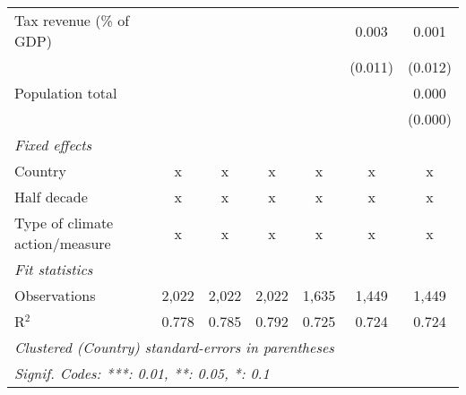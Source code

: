 \begin{tabular}{lcccccc}
   Tax revenue (\% of GDP)                                                                             &         &               &                &                & 0.003         & 0.001\\   
                                                                                                       &         &               &                &                & (0.011)       & (0.012)\\   
   Population total                                                                                    &         &               &                &                &               & 0.000\\   
                                                                                                       &         &               &                &                &               & (0.000)\\   
   \emph{Fixed effects}\\
   Country                                                                                             & x       & x             & x              & x              & x             & x\\  
   Half decade                                                                                         & x       & x             & x              & x              & x             & x\\  
   Type of climate action/measure                                                                      & x       & x             & x              & x              & x             & x\\  
   \midrule \emph{Fit statistics}\\
   Observations                                                                                        & 2,022   & 2,022         & 2,022          & 1,635          & 1,449         & 1,449\\  
   R$^2$                                                                                               & 0.778   & 0.785         & 0.792          & 0.725          & 0.724         & 0.724\\  
   \midrule
   \multicolumn{7}{l}{\emph{Clustered (Country) standard-errors in parentheses}}\\
   \multicolumn{7}{l}{\emph{Signif. Codes: ***: 0.01, **: 0.05, *: 0.1}}\\
\end{tabular}
\par\endgroup


